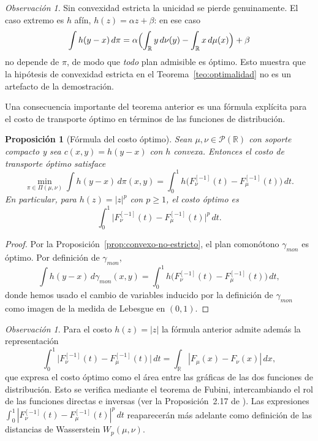 \documentclass[12pt, a4paper]{amsbook}
\newcommand{\R}{{\mathbb R}}
\newtheorem{prop}[teo]{Proposición}
\theoremstyle{remark}
\newtheorem{obs}[teo]{Observación}
\theoremstyle{definition}
\numberwithin{section}{chapter}
\numberwithin{subsection}{section}
\numberwithin{equation}{section}
\numberwithin{figure}{chapter}
\begin{document}
\begin{obs}
Sin convexidad estricta la unicidad se pierde genuinamente. El caso extremo es
$h$ afín, $h(z)=\alpha z+\beta$: en ese caso
\[
\int h(y-x)\,d\pi
=\alpha\Bigl(\int_\R y\,d\nu(y)-\int_\R x\,d\mu(x)\Bigr)+\beta
\]
no depende de $\pi$, de modo que \emph{todo} plan admisible es óptimo. Esto muestra
que la hipótesis de convexidad estricta en el Teorema~\ref{teo:optimalidad} no es
un artefacto de la demostración.
\end{obs}

Una consecuencia importante del teorema anterior es una fórmula explícita para el
costo de transporte óptimo en términos de las funciones de distribución.

\begin{prop}[Fórmula del costo óptimo]\label{prop:formula-costo}
Sean $\mu,\nu\in\mathcal P(\R)$ con soporte compacto y sea $c(x,y)=h(y-x)$ con
$h$ convexa. Entonces el costo de transporte óptimo satisface
\[
\min_{\pi\in\Pi(\mu,\nu)}
\int h(y-x)\,d\pi(x,y)
=
\int_0^1 h\bigl(F_\nu^{[-1]}(t)-F_\mu^{[-1]}(t)\bigr)\,dt.
\]
En particular, para $h(z)=|z|^p$ con $p\ge1$, el costo óptimo es
\[
\int_0^1
\bigl|F_\nu^{[-1]}(t)-F_\mu^{[-1]}(t)\bigr|^p\,dt.
\]
\end{prop}
\begin{proof}
Por la Proposición~\ref{prop:convexo-no-estricto}, el plan comonótono
$\gamma_{mon}$ es óptimo. Por definición de $\gamma_{mon}$,
\[
\int h(y-x)\,d\gamma_{mon}(x,y)
=
\int_0^1 h\bigl(F_\nu^{[-1]}(t)-F_\mu^{[-1]}(t)\bigr)\,dt,
\]
donde hemos usado el cambio de variables inducido por la definición de $\gamma_{mon}$
como imagen de la medida de Lebesgue en $(0,1)$.
\end{proof}

\begin{obs}
Para el costo $h(z)=|z|$ la fórmula anterior admite además la representación
\[
\int_0^1\bigl|F_\nu^{[-1]}(t)-F_\mu^{[-1]}(t)\bigr|\,dt
=\int_\R |F_\mu(x)-F_\nu(x)|\,dx,
\]
que expresa el costo óptimo como el área entre las gráficas de las dos funciones
de distribución. Esto se verifica mediante el teorema de Fubini, intercambiando
el rol de las funciones directas e inversas (ver la Proposición~2.17 de
\cite{Santambrogio}). Las expresiones
$\int_0^1|F_\nu^{[-1]}(t)-F_\mu^{[-1]}(t)|^p\,dt$ reaparecerán más adelante
como definición de las distancias de Wasserstein $W_p(\mu,\nu)$.
\end{obs}

\end{document}
